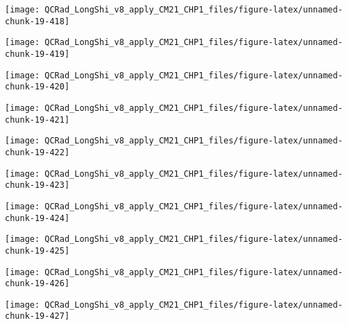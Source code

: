 \documentclass[
  10pt,
  a4paper,oneside]{article}
\begin{document}
\begin{center}\texttt{[image: QCRad\_LongShi\_v8\_apply\_CM21\_CHP1\_files/figure-latex/unnamed-chunk-19-418]} \end{center}

\begin{center}\texttt{[image: QCRad\_LongShi\_v8\_apply\_CM21\_CHP1\_files/figure-latex/unnamed-chunk-19-419]} \end{center}

\begin{center}\texttt{[image: QCRad\_LongShi\_v8\_apply\_CM21\_CHP1\_files/figure-latex/unnamed-chunk-19-420]} \end{center}

\begin{center}\texttt{[image: QCRad\_LongShi\_v8\_apply\_CM21\_CHP1\_files/figure-latex/unnamed-chunk-19-421]} \end{center}

\begin{center}\texttt{[image: QCRad\_LongShi\_v8\_apply\_CM21\_CHP1\_files/figure-latex/unnamed-chunk-19-422]} \end{center}

\begin{center}\texttt{[image: QCRad\_LongShi\_v8\_apply\_CM21\_CHP1\_files/figure-latex/unnamed-chunk-19-423]} \end{center}

\begin{center}\texttt{[image: QCRad\_LongShi\_v8\_apply\_CM21\_CHP1\_files/figure-latex/unnamed-chunk-19-424]} \end{center}

\begin{center}\texttt{[image: QCRad\_LongShi\_v8\_apply\_CM21\_CHP1\_files/figure-latex/unnamed-chunk-19-425]} \end{center}

\begin{center}\texttt{[image: QCRad\_LongShi\_v8\_apply\_CM21\_CHP1\_files/figure-latex/unnamed-chunk-19-426]} \end{center}

\begin{center}\texttt{[image: QCRad\_LongShi\_v8\_apply\_CM21\_CHP1\_files/figure-latex/unnamed-chunk-19-427]} \end{center}
\end{document}
